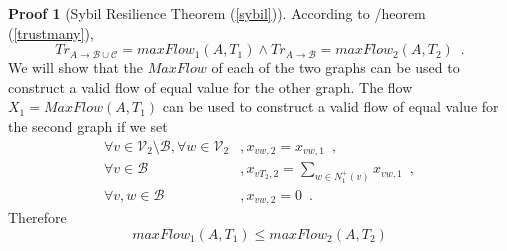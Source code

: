 \documentclass[11pt]{llncs}
\theoremstyle{definition}
\newtheorem{sepproof}{Proof}
\begin{document}
\begin{sepproof}[Sybil Resilience Theorem (\ref{sybil})]
       According to /heorem (\ref{trustmany}),
       \begin{equation}
       \label{trmaxflow}
          Tr_{A \rightarrow \mathcal{B} \cup \mathcal{C}} = maxFlow_1\left(A, T_1\right) \wedge
          Tr_{A \rightarrow \mathcal{B}} = maxFlow_2\left(A, T_2\right) \enspace.
       \end{equation}
       We will show that the $MaxFlow$ of each of the two graphs can be used to construct a valid flow of equal value for the
       other graph. The flow $X_1 = MaxFlow\left(A, T_1\right)$ can be used to construct a valid flow of equal value for the
       second graph if we set
       \begin{align}
          \forall v \in \mathcal{V}_2 \setminus \mathcal{B}, \forall w \in \mathcal{V}_2&, x_{vw,2} = x_{vw,1} \enspace, \\
          \forall v \in \mathcal{B}&, x_{vT_2,2} = \sum\limits_{w \in N^{+}_1\left(v\right)}x_{vw,1} \enspace, \\
          \forall v,w \in \mathcal{B}&, x_{vw,2} = 0 \enspace.
       \end{align}
       Therefore
       \begin{equation}
          maxFlow_1\left(A, T_1\right) \leq maxFlow_2\left(A, T_2\right)
       \end{equation}

\end{sepproof}
\end{document}
